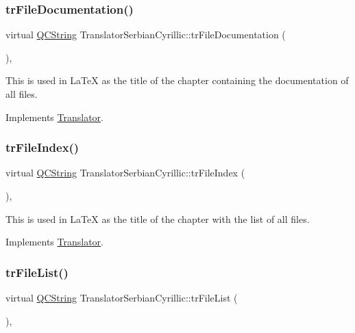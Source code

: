 \subsubsection{\texorpdfstring{trFileDocumentation()}{trFileDocumentation()}}
{\footnotesize\ttfamily virtual \mbox{\hyperlink{class_q_c_string}{Q\+C\+String}} Translator\+Serbian\+Cyrillic\+::tr\+File\+Documentation (\begin{DoxyParamCaption}{ }\end{DoxyParamCaption})\hspace{0.3cm}{\ttfamily [inline]}, {\ttfamily [virtual]}}

This is used in La\+TeX as the title of the chapter containing the documentation of all files. 

Implements \mbox{\hyperlink{class_translator}{Translator}}.

\mbox{\label{class_translator_serbian_cyrillic_a243e680a570f9a12cae51cf8245e5488}} 
\subsubsection{\texorpdfstring{trFileIndex()}{trFileIndex()}}
{\footnotesize\ttfamily virtual \mbox{\hyperlink{class_q_c_string}{Q\+C\+String}} Translator\+Serbian\+Cyrillic\+::tr\+File\+Index (\begin{DoxyParamCaption}{ }\end{DoxyParamCaption})\hspace{0.3cm}{\ttfamily [inline]}, {\ttfamily [virtual]}}

This is used in La\+TeX as the title of the chapter with the list of all files. 

Implements \mbox{\hyperlink{class_translator}{Translator}}.

\mbox{\label{class_translator_serbian_cyrillic_af49c9174bbd066b6b961726cecafdc64}} 
\subsubsection{\texorpdfstring{trFileList()}{trFileList()}}
{\footnotesize\ttfamily virtual \mbox{\hyperlink{class_q_c_string}{Q\+C\+String}} Translator\+Serbian\+Cyrillic\+::tr\+File\+List (\begin{DoxyParamCaption}{ }\end{DoxyParamCaption})\hspace{0.3cm}{\ttfamily [inline]}, {\ttfamily [virtual]}}

